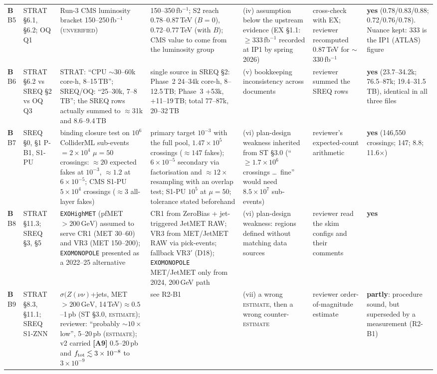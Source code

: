 \documentclass[11pt,a4paper]{article}
\newcommand{\EST}{\textsc{estimate}}
\newcommand{\UNV}{\textsc{unverified}}
\newcommand{\GeV}{\,\mathrm{GeV}}
\newcommand{\catB}{\textcolor{warn}{\textbf{B}}}
\newcommand{\lab}[1]{\textbf{[#1]}}
\begin{document}
\begin{landscape}
{\begin{longtable}{@{}L{1.0cm}L{2.5cm}L{4.6cm}L{4.6cm}L{3.6cm}L{3.6cm}L{2.6cm}@{}}
\catB{}\,B5 & STRAT \S6.1, \S6.2; OQ Q1 & Run-3 CMS luminosity bracket 150--250\,fb$^{-1}$ (\UNV) & 150--350\,fb$^{-1}$; S2 reach 0.78--0.87\,TeV ($B=0$), 0.72--0.77\,TeV (with $B$); CMS value to come from the luminosity group & (iv) assumption below the upstream evidence (EX \S1.1: $\geq333$\,fb$^{-1}$ recorded at IP1 by spring 2026) & cross-check with EX; reviewer recomputed 0.87\,TeV for $\sim$330\,fb$^{-1}$ & \textbf{yes} (0.78/0.83/0.88; 0.72/0.76/0.78). Nuance kept: 333 is the IP1 (ATLAS) figure\\
\catB{}\,B6 & STRAT \S6.2 vs SREQ \S2 vs OQ Q3 & STRAT: ``CPU $\sim$30--60k core-h, 8--15\,TB''; SREQ/OQ: ``25--30k, 7--8\,TB''; the SREQ rows actually summed to $\approx$31k and 8.6--9.4\,TB & single source in SREQ \S2: Phase~2 24--34k core-h, 8--12.5\,TB; Phase~3 +53k, +11--19\,TB; total 77--87k, 20--32\,TB & (v) bookkeeping inconsistency across documents & reviewer summed the SREQ rows & \textbf{yes} (23.7--34.2k; 76.5--87k; 19.4--31.5\,TB), identical in all three files\\
\catB{}\,B7 & SREQ \S0, \S1 P-B1, S1-PU & binding closure test on $10^6$ ColliderML sub-events $=2\times10^4$ $\mu=50$ crossings: $\approx20$ expected fakes at $10^{-3}$, $\approx1.2$ at $6\times10^{-5}$; CMS S1-PU $5\times10^4$ crossings ($\approx3$ all-layer fakes) & primary target $10^{-3}$ with the full pool, $1.47\times10^5$ crossings ($\approx147$ fakes); $6\times10^{-5}$ secondary via factorisation and $\approx12\times$ resampling with an overlap test; S1-PU $10^5$ at $\mu=50$; tolerance stated beforehand & (vi) plan-design weakness inherited from ST \S3.0 (``$\geq1.7\times10^6$ crossings \ldots\ fine'' would need $8.5\times10^7$ sub-events) & reviewer's expected-count arithmetic & \textbf{yes} (146{,}550 crossings; 147; 8.8; 11.6$\times$)\\
\catB{}\,B8 & STRAT \S11.3; SREQ \S3, \S5 & \texttt{EXOHighMET} (pfMET $>200\GeV$) assumed to serve CR1 (MET 30--60) and VR3 (MET 150--200); \texttt{EXOMONOPOLE} presented as a 2022--25 alternative & CR1 from ZeroBias + jet-triggered JetMET RAW; VR3 from MET/JetMET RAW via pick-events; fallback VR3$'$ (D18); \texttt{EXOMONOPOLE} MET/JetMET only from 2024, 200\,GeV path & (vi) plan-design weakness: regions defined without matching data sources & reviewer read the skim configs and their comments & \textbf{yes}\\
\catB{}\,B9 & STRAT \S8.3, \S11.1; SREQ S1-ZNN & $\sigma(Z(\nu\nu)$+jets, MET $>200\GeV$, 14\,TeV$)\approx0.5$--1\,pb (ST \S3.0, \EST); reviewer: ``probably $\sim10\times$ low'', 5--20\,pb (\EST); v2 carried \lab{A9} 0.5--20\,pb and $f_{\rm tot}\lesssim3\times10^{-8}$ to $3\times10^{-9}$ & see R2-B1 & (vii) a wrong \EST, then a wrong counter-\EST{} & reviewer order-of-magnitude estimate & \textbf{partly}: procedure sound, but superseded by a measurement (R2-B1)\\

\end{longtable}}
\end{landscape}
\end{document}
